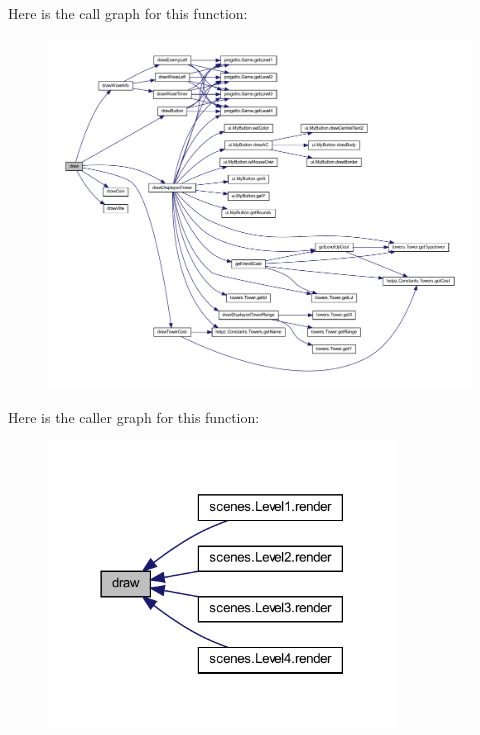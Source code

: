 Here is the call graph for this function\+:\nopagebreak
\begin{figure}[H]
\begin{center}
\leavevmode
\includegraphics[width=350pt]{classui_1_1_action_bar_a72fe1ffca978e99fd16994a10e7f8051_cgraph}
\end{center}
\end{figure}
Here is the caller graph for this function\+:\nopagebreak
\begin{figure}[H]
\begin{center}
\leavevmode
\includegraphics[width=261pt]{classui_1_1_action_bar_a72fe1ffca978e99fd16994a10e7f8051_icgraph}
\end{center}
\end{figure}
\mbox{\label{classui_1_1_action_bar_a65768678909bc0512c6cb9780709ad38}} 
